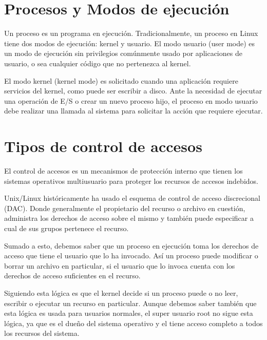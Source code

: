 	\section{Procesos y Modos de ejecución}
		
	Un proceso es un programa en ejecución. Tradicionalmente, un proceso en Linux tiene dos modos de ejecución: kernel y usuario. El modo usuario (user mode) es un modo de ejecución sin privilegios comúnmente usado por aplicaciones de usuario, o sea cualquier código que no pertenezca al kernel. \newline
	
	El modo kernel (kernel mode) es solicitado cuando una aplicación requiere servicios del kernel, como puede ser escribir a disco. Ante la necesidad de ejecutar una operación de E/S o crear un nuevo proceso hijo, el proceso en modo usuario debe realizar una llamada al sistema para solicitar la acción que requiere ejecutar. 
		
	\section{Tipos de control de accesos}
		
	El control de accesos es un mecanismos de protección interno que tienen los sistemas operativos multiusuario para proteger los recursos de accesos indebidos. \newline
	
	Unix/Linux históricamente ha usado el esquema de control de acceso discrecional (DAC). Donde generalmente el propietario del recurso o archivo en cuestión, administra los derechos de acceso sobre el mismo y también puede especificar a cual de sus grupos pertenece el recurso. \cite{6} \newline
	
	Sumado a esto, debemos saber que un proceso en ejecución toma los derechos de acceso que tiene el usuario que lo ha invocado. Así un proceso puede modificar o borrar un archivo en particular, si el usuario que lo invoca cuenta con los derechos de acceso suficientes en el recurso. \cite{5} \newline
	
	Siguiendo esta lógica es que el kernel decide si un proceso puede o no leer, escribir o ejecutar un recurso en particular. Aunque debemos saber también que esta lógica es usada para usuarios normales, el super usuario root no sigue esta lógica, ya que es el dueño del sistema operativo y el tiene acceso completo a todos los recursos del sistema. \newline
	

